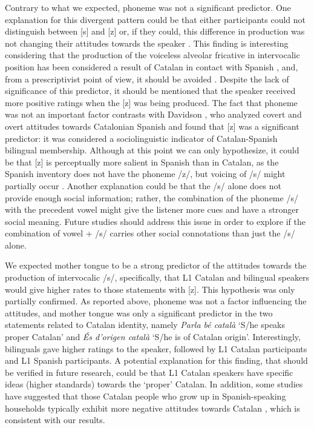 \documentclass[
  a4paper,
  11pt,
  twocolumn]{article}
\begin{document}
Contrary to what we expected, phoneme was not a significant predictor.
One explanation for this divergent pattern could be that either
participants could not distinguish between {[}s{]} and {[}z{]}
\cite{davidson_2019} or, if they could, this difference in production
was not changing their attitudes towards the speaker \cite{sinner_2002}.
This finding is interesting considering that the production of the
voiceless alveolar fricative in intervocalic position has been
considered a result of Catalan in contact with Spanish
\cite{benet_cortes_lleo_2012} \cite{recasens_1996} \cite{davidson_2020},
and, from a prescriptivist point of view, it should be avoided
\cite{iec_2022}. Despite the lack of significance of this predictor, it
should be mentioned that the speaker received more positive ratings when
the {[}z{]} was being produced. The fact that phoneme was not an
important factor contrasts with Davidson \cite{davidson_2020}, who
analyzed covert and overt attitudes towards Catalonian Spanish and found
that {[}z{]} was a significant predictor: it was considered a
sociolinguistic indicator of Catalan-Spanish bilingual membership.
Although at this point we can only hypothesize, it could be that {[}z{]}
is perceptually more salient in Spanish than in Catalan, as the Spanish
inventory does not have the phoneme /z/, but voicing of /s/ might
partially occur \cite{benet_cortes_lleo_2012} \cite{hualde_2015}
\cite{hualde_et_al_2020}. Another explanation could be that the /s/
alone does not provide enough social information; rather, the
combination of the phoneme /s/ with the precedent vowel might give the
listener more cues and have a stronger social meaning. Future studies
should address this issue in order to explore if the combination of
vowel + /s/ carries other social connotations than just the /s/ alone.

We expected mother tongue to be a strong predictor of the attitudes
towards the production of intervocalic /s/, specifically, that L1
Catalan and bilingual speakers would give higher rates to those
statements with {[}z{]}. This hypothesis was only partially confirmed.
As reported above, phoneme was not a factor influencing the attitudes,
and mother tongue was only a significant predictor in the two statements
related to Catalan identity, namely \emph{Parla bé català} `S/he speaks
proper Catalan' and \emph{És d'origen català} `S/he is of Catalan
origin'. Interestingly, bilinguals gave higher ratings to the speaker,
followed by L1 Catalan participants and L1 Spanish participants. A
potential explanation for this finding, that should be verified in
future research, could be that L1 Catalan speakers have specific ideas
(higher standards) towards the `proper' Catalan. In addition, some
studies have suggested that those Catalan people who grow up in
Spanish-speaking households typically exhibit more negative attitudes
towards Catalan \cite{aguilo_more_lynch_2017}, which is consistent with
our results.
\end{document}
